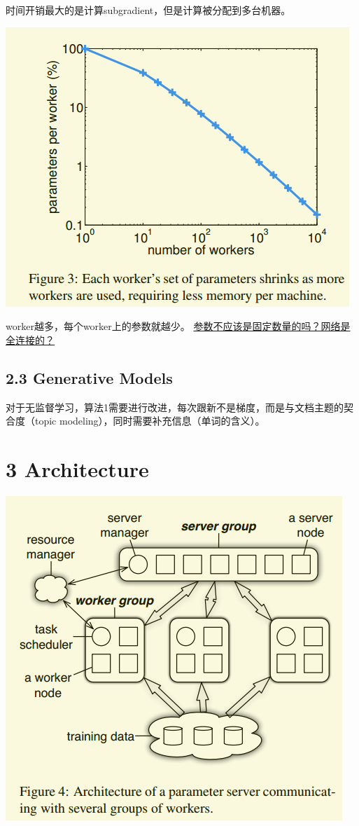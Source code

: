 \documentclass[11pt]{article}
\begin{document}
时间开销最大的是计算subgradient，但是计算被分配到多台机器。

\begin{center}
\includegraphics[width=.9\linewidth]{PS.org_imgs/20201110_140316_aTJmHM.png}
\end{center}

worker越多，每个worker上的参数就越少。 \uline{参数不应该是固定数量的吗？网络是全连接的？}
\subsection{2.3 Generative Models}
\label{sec:orgecff44e}
对于无监督学习，算法1需要进行改进，每次跟新不是梯度，而是与文档主题的契合度（topic modeling），同时需要补充信息（单词的含义）。
\section{3 Architecture}
\label{sec:orgadf642a}
\begin{center}
\includegraphics[width=.9\linewidth]{PS.org_imgs/20201110_182452_3VgbEb.png}
\end{center}
\end{document}
